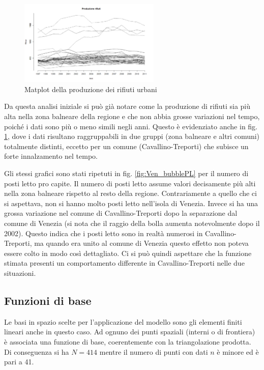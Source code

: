 \documentclass[a4paper,11pt,twoside,openright]{book}							%
\begin{document}
\newpage
\begin{figure}[t]
\centering
	\includegraphics[width=0.60\textwidth]{Immagini/Matplot.png}   
 \caption{Matplot della produzione dei rifiuti urbani}
   \label{fig:Ven_matplot}
\end{figure}
Da questa analisi iniziale si può già notare come la produzione di rifiuti sia più alta nella zona balneare della regione e che non abbia grosse variazioni nel tempo, poiché i dati sono più o meno simili negli anni. Questo è evidenziato anche in fig. \ref{fig:Ven_matplot}, dove i dati risultano raggruppabili in due gruppi (zona balneare e altri comuni) totalmente distinti, eccetto per un comune (Cavallino-Treporti) che subisce un forte innalzamento nel tempo.

Gli stessi grafici sono stati ripetuti in fig. \ref{fig:Ven_bubblePL} per il numero di posti letto pro capite. Il numero di posti letto assume valori decisamente più alti nella zona balneare rispetto al resto della regione. Contrariamente a quello che ci si aspettava, non si hanno molto posti letto nell'isola di Venezia. Invece si ha una grossa variazione nel comune di Cavallino-Treporti dopo la separazione dal comune di Venezia (si nota che il raggio della bolla aumenta notevolmente dopo il 2002). Questo indica che i posti letto sono in realtà numerosi in Cavallino-Treporti, ma quando era unito al comune di Venezia questo effetto non poteva essere colto in modo così dettagliato. Ci si può quindi aspettare che la funzione stimata presenti un comportamento differente in Cavallino-Treporti nelle due situazioni.

\subsection{Funzioni di base}
Le basi in spazio scelte per l'applicazione del modello sono gli elementi finiti lineari anche in questo caso. Ad ognuno dei punti spaziali (interni o di frontiera) è associata una funzione di base, coerentemente con la triangolazione prodotta. Di conseguenza si ha $N=414$ mentre il numero di punti con dati $n$ è minore ed è pari a 41.
\end{document}
